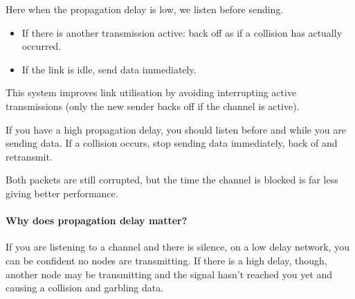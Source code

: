 Here when the propagation delay is low, we listen before sending.
\begin{itemize}
    \item If there is another transmission active: back off as if a collision has actually occurred.
    \item If the link is idle, send data immediately.
\end{itemize}
This system improves link utilisation by avoiding interrupting active transmissions (only the new sender backs off if the channel is active).

If you have a high propagation delay, you should listen before and while you are sending data.
If a collision occurs, stop sending data immediately, back of and retransmit.

\begin{note}
    Both packets are still corrupted, but the time the channel is blocked is far less giving better performance.
\end{note}

\paragraph{Why does propagation delay matter?}\label{par:why_does_propagation_delay_matter_}

If you are listening to a channel and there is silence, on a low delay network, you can be confident no nodes are transmitting.
If there is a high delay, though, another node may be transmitting and the signal hasn't reached you yet and causing a collision and garbling data.
